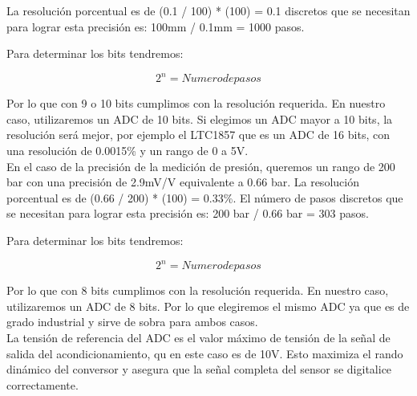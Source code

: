 La resolución porcentual es de (0.1 / 100) * (100) = 0.1 %
discretos que se necesitan para lograr esta precisión es: 100mm / 0.1mm = 1000
pasos.

Para determinar los bits tendremos:

\begin{equation*}
	2^n = Numero de pasos
\end{equation*}

Por lo que con 9 o 10 bits cumplimos con la resolución requerida. En nuestro caso, utilizaremos un ADC de 10 bits. Si elegimos un ADC mayor a 10 bits, la resolución será mejor, por ejemplo el LTC1857 que es un ADC de 16 bits, con una resolución de 0.0015\% y un rango de 0 a 5V.\\

En el caso de la precisión de la medición de presión, queremos un rango de 200 bar con una precisión de 2.9mV/V equivalente a 0.66 bar. La resolución porcentual es de (0.66 / 200) * (100) = 0.33\%. El número de pasos discretos que se necesitan para lograr esta precisión es: 200 bar / 0.66 bar = 303 pasos.

Para determinar los bits tendremos:

\begin{equation*}
	2^n = Numero de pasos
\end{equation*}

Por lo que con 8 bits cumplimos con la resolución requerida. En nuestro caso, utilizaremos un ADC de 8 bits. Por lo que elegiremos el mismo ADC ya que es de grado industrial y sirve de sobra para ambos casos.\\

La tensión de referencia del ADC es el valor máximo de tensión de la señal de salida del acondicionamiento, qu en este caso es de 10V. Esto maximiza el rando dinámico del conversor y asegura que la señal completa del sensor se digitalice correctamente. 